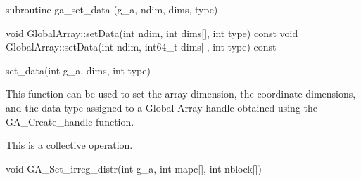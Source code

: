 \documentclass[12pt]{article}
\begin{document}
\begin{fapi}
\begin{fcode}
subroutine ga_set_data (g_a, ndim, dims, type)
\end{fcode}
\begin{funcargs}
\end{funcargs}
\end{fapi}

\begin{cxxapi}
\begin{cxxcode}
void GlobalArray::setData(int ndim, int dims[], int type) const
void GlobalArray::setData(int ndim, int64_t dims[], int type) const
\end{cxxcode}
\begin{funcargs}
\end{funcargs}
\end{cxxapi}

\begin{pyapi}
\begin{pycode}
set_data(int g_a, dims, int type)
\end{pycode}
\end{pyapi}

\begin{desc}

  This function can be used to set the array dimension, the coordinate
  dimensions, and the data type assigned to a Global Array handle
  obtained using the GA_Create_handle function.

  This is a collective operation.
\end{desc}



\begin{capi}
\begin{ccode}
void GA_Set_irreg_distr(int g_a, int mapc[], int nblock[])
\end{ccode}
\begin{funcargs}
\end{funcargs}
\end{capi}
\end{document}
